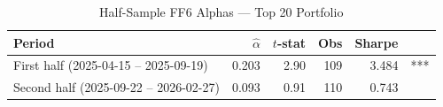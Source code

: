 \begin{table}[htbp]\centering
\caption{Half-Sample FF6 Alphas — Top 20 Portfolio}
\label{tab:alpha_halves}
\begin{tabular}{lrrrrl}
\toprule
Period & $\hat{\alpha}$ & $t$-stat & Obs & Sharpe & \\
\midrule
First half (2025-04-15 – 2025-09-19) & 0.203 & 2.90 & 109 & 3.484 & *** \\
Second half (2025-09-22 – 2026-02-27) & 0.093 & 0.91 & 110 & 0.743 &  \\
\bottomrule
\end{tabular}
\end{table}